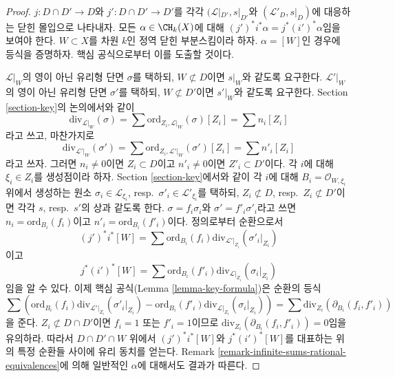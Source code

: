 \begin{proof}
$j : D \cap D' \to D$와 $j' : D \cap D' \to D'$를 각각
$(\mathcal{L}|_{D'}, s|_{D'}$와 $(\mathcal{L}'_D, s|_D)$에 대응하는
닫힌 몰입으로 나타내자. 모든 $\alpha \in \CH_k(X)$에 대해
$(j')^*i^*\alpha = j^* (i')^*\alpha$임을 보여야 한다.
$W \subset X$를 차원 $k$인 정역 닫힌 부분스킴이라 하자.
$\alpha = [W]$인 경우에 등식을 증명하자. 핵심 공식으로부터 이를
도출할 것이다.

\medskip\noindent
$\mathcal{L}|_W$의 영이 아닌 유리형 단면 $\sigma$를 택하되,
$W \not \subset D$이면 $s|_W$와 같도록 요구한다.
$\mathcal{L}'|_W$의 영이 아닌 유리형 단면 $\sigma'$를 택하되,
$W \not \subset D'$이면 $s'|_W$와 같도록 요구한다. Section
\ref{section-key}의 논의에서와 같이
$$
\text{div}_{\mathcal{L}|_W}(\sigma) =
\sum \text{ord}_{Z_i, \mathcal{L}|_W}(\sigma)[Z_i] = \sum n_i[Z_i]
$$
라고 쓰고, 마찬가지로
$$
\text{div}_{\mathcal{L}'|_W}(\sigma') =
\sum \text{ord}_{Z_i, \mathcal{L}'|_W}(\sigma')[Z_i] = \sum n'_i[Z_i]
$$
라고 쓰자. 그러면 $n_i \not = 0$이면 $Z_i \subset D$이고
$n'_i \not = 0$이면 $Z'_i \subset D'$이다. 각 $i$에 대해
$\xi_i \in Z_i$를 생성점이라 하자. Section \ref{section-key}에서와 같이
각 $i$에 대해 $B_i = \mathcal{O}_{W, \xi_i}$ 위에서 생성하는 원소
$\sigma_i \in \mathcal{L}_{\xi_i}$, resp.\ $\sigma'_i \in \mathcal{L}'_{\xi_i}$를
택하되, $Z_i \not \subset D$, resp.\ $Z_i \not \subset D'$이면 각각
$s$, resp.\ $s'$의 상과 같도록 한다.
$\sigma = f_i \sigma_i$와 $\sigma' = f'_i\sigma'_i$라고 쓰면
$n_i = \text{ord}_{B_i}(f_i)$이고
$n'_i = \text{ord}_{B_i}(f'_i)$이다. 정의로부터 순환으로서
$$
(j')^*i^*[W] =
\sum \text{ord}_{B_i}(f_i) \text{div}_{\mathcal{L}'|_{Z_i}}(\sigma'_i|_{Z_i})
$$
이고
$$
j^*(i')^*[W] =
\sum \text{ord}_{B_i}(f'_i) \text{div}_{\mathcal{L}|_{Z_i}}(\sigma_i|_{Z_i})
$$
임을 알 수 있다. 이제 핵심 공식(Lemma \ref{lemma-key-formula})은
순환의 등식
$$
\sum \left(
\text{ord}_{B_i}(f_i) \text{div}_{\mathcal{L}'|_{Z_i}}(\sigma'_i|_{Z_i}) -
\text{ord}_{B_i}(f'_i) \text{div}_{\mathcal{L}|_{Z_i}}(\sigma_i|_{Z_i})
\right) =
\sum \text{div}_{Z_i}(\partial_{B_i}(f_i, f'_i))
$$
을 준다. $Z_i \not \subset D \cap D'$이면 $f_i = 1$ 또는
$f'_i = 1$이므로
$\text{div}_{Z_i}(\partial_{B_i}(f_i, f'_i)) = 0$임을 유의하라.
따라서 $D \cap D' \cap W$ 위에서 $(j')^*i^*[W]$와
$j^*(i')^*[W]$를 대표하는 위의 특정 순환들 사이에 유리 동치를 얻는다.
Remark \ref{remark-infinite-sums-rational-equivalences}에 의해 일반적인
$\alpha$에 대해서도 결과가 따른다.
\end{proof}
















